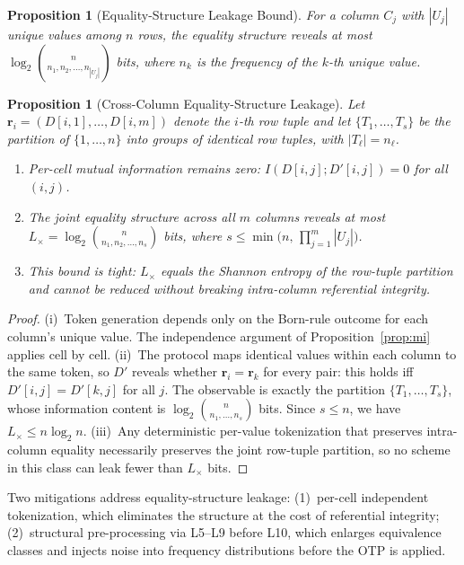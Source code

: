 \documentclass[acmsmall,screen,review,anonymous]{acmart}
\newtheorem{proposition}[theorem]{Proposition}
\begin{document}
\begin{proposition}[Equality-Structure Leakage Bound]
\label{prop:equality}
For a column $C_j$ with $|U_j|$ unique values among $n$ rows, the equality structure reveals at most $\log_2 \binom{n}{n_1, n_2, \ldots, n_{|U_j|}}$ bits, where $n_k$ is the frequency of the $k$-th unique value.
\end{proposition}

\begin{proposition}[Cross-Column Equality-Structure Leakage]
\label{prop:crosscol}
Let $\mathbf{r}_i = (D[i,1], \ldots, D[i,m])$ denote the $i$-th row tuple and let $\{T_1, \ldots, T_s\}$ be the partition of $\{1,\ldots,n\}$ into groups of identical row tuples, with $|T_\ell| = n_\ell$.
\begin{enumerate}
\item[\textup{(i)}] Per-cell mutual information remains zero: $I(D[i,j]; D'[i,j]) = 0$ for all $(i,j)$.
\item[\textup{(ii)}] The joint equality structure across all $m$ columns reveals at most $L_{\times} = \log_2 \binom{n}{n_1, n_2, \ldots, n_s}$ bits, where $s \leq \min\!\bigl(n,\, \prod_{j=1}^{m} |U_j|\bigr)$.
\item[\textup{(iii)}] This bound is tight: $L_{\times}$ equals the Shannon entropy of the row-tuple partition and cannot be reduced without breaking intra-column referential integrity.
\end{enumerate}
\end{proposition}

\begin{proof}
(i)~Token generation depends only on the Born-rule outcome for each column's unique value. The independence argument of Proposition~\ref{prop:mi} applies cell by cell.
(ii)~The protocol maps identical values within each column to the same token, so $D'$ reveals whether $\mathbf{r}_i = \mathbf{r}_k$ for every pair: this holds iff $D'[i,j] = D'[k,j]$ for all $j$. The observable is exactly the partition $\{T_1,\ldots,T_s\}$, whose information content is $\log_2\binom{n}{n_1,\ldots,n_s}$ bits. Since $s \leq n$, we have $L_{\times} \leq n \log_2 n$.
(iii)~Any deterministic per-value tokenization that preserves intra-column equality necessarily preserves the joint row-tuple partition, so no scheme in this class can leak fewer than $L_{\times}$ bits.
\end{proof}

Two mitigations address equality-structure leakage: (1)~per-cell independent tokenization, which eliminates the structure at the cost of referential integrity; (2)~structural pre-processing via L5--L9 before L10, which enlarges equivalence classes and injects noise into frequency distributions before the OTP is applied.
\end{document}
